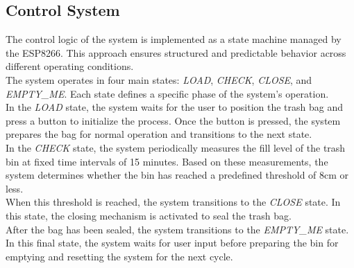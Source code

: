 \documentclass{article}
\begin{document}
\subsection{Control System}
The control logic of the system is implemented as a state machine managed by the ESP8266. This approach ensures structured and predictable behavior across different operating conditions.\\
The system operates in four main states: \textit{LOAD}, \textit{CHECK}, \textit{CLOSE}, and \textit{EMPTY\_ME}. Each state defines a specific phase of the system’s operation.\\
In the \textit{LOAD} state, the system waits for the user to position the trash bag and press a button to initialize the process. Once the button is pressed, the system prepares the bag for normal operation and transitions to the next state.\\
In the \textit{CHECK} state, the system periodically measures the fill level of the trash bin at fixed time intervals of 15 minutes. Based on these measurements, the system determines whether the bin has reached a predefined threshold of 8cm or less.\\
When this threshold is reached, the system transitions to the \textit{CLOSE} state. In this state, the closing mechanism is activated to seal the trash bag.\\
After the bag has been sealed, the system transitions to the \textit{EMPTY\_ME} state. In this final state, the system waits for user input before preparing the bin for emptying and resetting the system for the next cycle.
\end{document}
